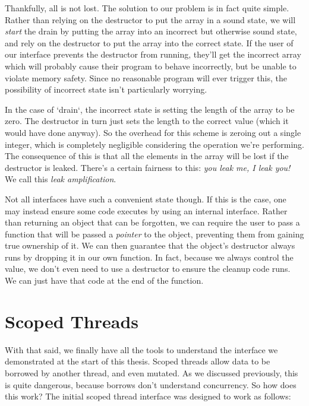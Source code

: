 Thankfully, all is not lost. The solution to our problem is in fact quite simple.
Rather than relying on the destructor to put the array in a sound state,
we will \emph{start} the drain by putting the array into an incorrect but otherwise
sound state, and rely on the destructor to put the array into the correct state.
If the user of our interface prevents the destructor from running,
they'll get the incorrect array which will probably cause their program to behave
incorrectly, but be unable to violate memory safety. Since no reasonable program
will ever trigger this, the possibility of incorrect state isn't particularly
worrying.

In the case of `drain`, the incorrect state is setting the length of the array to be zero.
The destructor in turn just sets the length to the correct value (which it would
have done anyway). So the overhead for this scheme is zeroing out a single
integer, which is completely negligible considering the operation we're performing.
The consequence of this is that all the elements in the array will be
lost if the destructor is leaked. There's a certain fairness to this:
\emph{you leak me, I leak you!} We call this \emph{leak amplification}.

Not all interfaces have such a convenient state though. If this is the case, one
may instead ensure some code executes by using an internal interface. Rather
than returning an object that can be forgotten, we can require the user to pass a
function that will be passed a \emph{pointer} to the object, preventing them from
gaining true ownership of it. We can then guarantee that the object's
destructor always runs by dropping it in our own function. In fact, because we
always control the value, we don't even need to use a destructor to ensure the
cleanup code runs. We can just have that code at the end of the function.





\section{Scoped Threads}

With that said, we finally have all the tools to understand the interface we
demonstrated at the start of this thesis. Scoped threads allow data to be borrowed
by another thread, and even mutated. As we discussed previously, this is quite
dangerous, because borrows don't understand concurrency. So how does this work?
The initial scoped thread interface was designed to work as follows:

